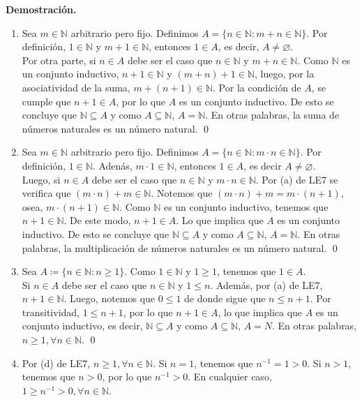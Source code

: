\documentclass[11pt]{article}
\newcommand{\N}{\mathbb{N}}
\let\emptyset\varnothing
\begin{document}
\textbf{Demostración.}

\begin{enumerate}[label=\alph*)]
    \item Sea $m\in \N$ arbitrario pero fijo. Definimos $A=\{ n\in \N : m+n \in \N \}$. Por definición, $1\in \N$ y $m+1\in \N$, entonces $1\in A$, es decir, $A\neq \emptyset$. \\[5pt] Por otra parte, si $n\in A$ debe ser el caso que $n\in \N$ y $m+n\in \N$. Como $\N$ es un conjunto inductivo, $n+1 \in \N$ y $(m+n)+1 \in \N$, luego, por la asociatividad de la suma, $m+(n+1)\in \N$. Por la condición de $A$, se cumple que $n+1\in A$, por lo que $A$ es un conjunto inductivo. De esto se concluye que $\N\subseteq A$ y como $A\subseteq \N$, $A=\N$. En otras palabras, la suma de números naturales es un número natural. \qed
    
    \item Sea $m\in \N$ arbitrario pero fijo. Definimos $A=\{n\in \N: m\cdot n \in \N\}$. Por definición, $1 \in \N$. Adenás, $m\cdot 1 \in \N$, entonces $1 \in A$, es decir $A \neq \emptyset$.\\[5pt] 
    Luego, si $n \in A$ debe ser el caso que $n\in \N$ y $m \cdot n \in \N$. Por (a) de LE7 se verifica que $(m \cdot n) + m \in \N$. Notemos que $(m \cdot n) + m=m \cdot (n+1)$, osea, $m \cdot (n+1) \in \N$. Como $\N$ es un conjunto inductivo, tenemos que $n+1\in \N$. De este modo, $n+1\in A$. Lo que implica que $A$ es un conjunto inductivo. De esto se concluye que $\N \subseteq A$ y como $A\subseteq \N$, $A=\N$. En otras palabras, la multiplicación de números naturales es un número natural. \qed

    \item Sea $A\coloneqq \{n\in \N: n\geq 1\}$. Como $1\in \N$ y $1\geq 1$, tenemos que $1\in A$.\\[5pt]
    Si $n\in A$ debe ser el caso que $n\in \N$ y $1\leq n$. Además, por (a) de LE7, $n+1\in \N$. Luego, notemos que $0 \leq 1$ de donde sigue que $n \leq n+1$. Por transitividad, $1\leq n+1$, por lo que $n+1\in A$, lo que implica que $A$ es un conjunto inductivo, es decir, $\N\subseteq A$ y como $A\subseteq \N$, $A=N$. En otras palabras, $n\geq 1, \forall n\in\N$. \qed

    \item Por (d) de LE7, $n\geq 1, \forall n\in \N$. Si $n=1$, tenemos que $n^{-1}=1>0$. Si $n>1$, tenemos que $n>0$, por lo que $n^{-1}>0$. En cualquier caso, $1\geq n^{-1}>0, \forall n\in \N$.


\end{enumerate}
\end{document}
